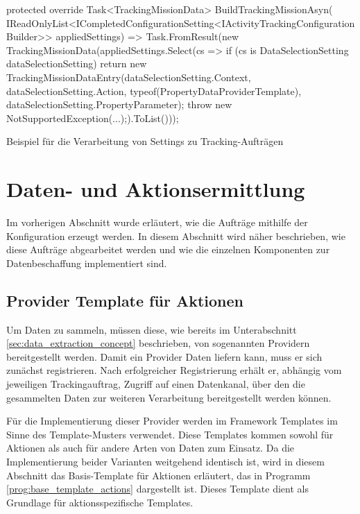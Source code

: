 \begin{program}[H]
\begin{CsCode}
protected override Task<TrackingMissionData> BuildTrackingMissionAsyn(
    IReadOnlyList<ICompletedConfigurationSetting<IActivityTrackingConfigurationBuilder>> appliedSettings) =>
        Task.FromResult(new TrackingMissionData(appliedSettings.Select(cs => {
            if (cs is DataSelectionSetting dataSelectionSetting)
            {
                return new TrackingMissionDataEntry(dataSelectionSetting.Context,
                                                    dataSelectionSetting.Action,
                                                    typeof(PropertyDataProviderTemplate),
                                                    dataSelectionSetting.PropertyParameter);
            }
            throw new NotSupportedException(...);}).ToList()));
\end{CsCode}
\caption{Beispiel für die Verarbeitung von Settings zu Tracking-Aufträgen}
\label{prog:example_processing_of_settings}
\end{program}

\section{Daten- und Aktionsermittlung}
\label{sec:data_collection_impl}
Im vorherigen Abschnitt wurde erläutert, wie die Aufträge mithilfe der Konfiguration erzeugt werden. In diesem Abschnitt wird näher beschrieben, wie diese Aufträge abgearbeitet werden und wie die einzelnen Komponenten zur Datenbeschaffung implementiert sind.

\subsection{Provider Template für Aktionen}
Um Daten zu sammeln, müssen diese, wie bereits im Unterabschnitt \ref{sec:data_extraction_concept} beschrieben, von sogenannten Providern bereitgestellt werden. Damit ein Provider Daten liefern kann, muss er sich zunächst registrieren. Nach erfolgreicher Registrierung erhält er, abhängig vom jeweiligen Trackingauftrag, Zugriff auf einen Datenkanal, über den die gesammelten Daten zur weiteren Verarbeitung bereitgestellt werden können.

Für die Implementierung dieser Provider werden im Framework Templates im Sinne des Template-Musters \cite{gamma1995design} verwendet. Diese Templates kommen sowohl für Aktionen als auch für andere Arten von Daten zum Einsatz. Da die Implementierung beider Varianten weitgehend identisch ist, wird in diesem Abschnitt das Basis-Template für Aktionen erläutert, das in Programm \ref{prog:base_template_actions} dargestellt ist. Dieses Template dient als Grundlage für aktionsspezifische Templates.

